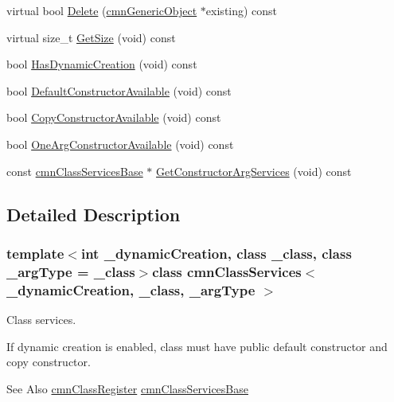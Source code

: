 \begin{DoxyCompactItemize}
\item 
virtual bool \hyperlink{classcmn_class_services_a10d72d0e3a2297bcd586ed0561922c5d}{Delete} (\hyperlink{classcmn_generic_object}{cmn\-Generic\-Object} $\ast$existing) const 
\item 
virtual size\-\_\-t \hyperlink{classcmn_class_services_a2e4ceaf16405914ad22b0c72fb6c95f9}{Get\-Size} (void) const 
\item 
bool \hyperlink{classcmn_class_services_a304746dc35ddd67a55eae55b7472a6ac}{Has\-Dynamic\-Creation} (void) const 
\item 
bool \hyperlink{classcmn_class_services_a6e69303c6c97d888ef062ab2bfd474ad}{Default\-Constructor\-Available} (void) const 
\item 
bool \hyperlink{classcmn_class_services_aa2aec0fe88dc59b2e431d5f0d5e0f564}{Copy\-Constructor\-Available} (void) const 
\item 
bool \hyperlink{classcmn_class_services_a8b0c2ccb060a9ad43981045cb336115f}{One\-Arg\-Constructor\-Available} (void) const 
\item 
const \hyperlink{classcmn_class_services_base}{cmn\-Class\-Services\-Base} $\ast$ \hyperlink{classcmn_class_services_a482b5e3237454e751d3c48c7ec215a24}{Get\-Constructor\-Arg\-Services} (void) const 
\end{DoxyCompactItemize}


\subsection{Detailed Description}
\subsubsection*{template$<$int \-\_\-dynamic\-Creation, class \-\_\-class, class \-\_\-arg\-Type = \-\_\-class$>$class cmn\-Class\-Services$<$ \-\_\-dynamic\-Creation, \-\_\-class, \-\_\-arg\-Type $>$}

Class services. 

If dynamic creation is enabled, class must have public default constructor and copy constructor.

\begin{DoxySeeAlso}{See Also}
\hyperlink{classcmn_class_register}{cmn\-Class\-Register} \hyperlink{classcmn_class_services_base}{cmn\-Class\-Services\-Base} 
\end{DoxySeeAlso}


